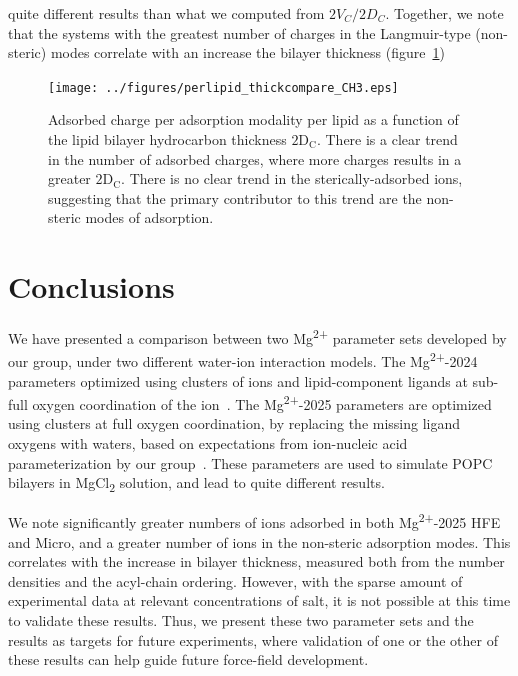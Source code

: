 \documentclass[12pt,openany,final]{book}
\newcommand{\dc}{$\text{2D}_\text{C}$}
\newcommand{\mg}{Mg\textsuperscript{2+}}
\newcommand{\mgcl}{MgCl\textsubscript{2}}
\begin{document}
quite different results than what we computed from $2V_C/2D_C$.
Together, we note that the systems with the greatest number of charges in the Langmuir-type (non-steric) modes correlate with an increase the
bilayer thickness (figure~\ref{fig:chargeperlipid})
\begin{figure}[h!]
    \caption[Adsorbed charge per mode per lipid]{Adsorbed charge per adsorption modality per lipid as a function of the lipid bilayer hydrocarbon thickness \dc{}. There is a clear trend in the number of adsorbed
        charges, where more charges results in a greater \dc{}. There is no clear trend in the sterically-adsorbed ions, suggesting that the primary contributor to this trend are
the non-steric modes of adsorption.}
    \label{fig:chargeperlipid}
    \texttt{[image: ../figures/perlipid\_thickcompare\_CH3.eps]}
\end{figure}
\section{Conclusions}
We have presented a comparison between two \mg{} parameter sets developed by our group, under two different water-ion interaction models. The \mg{-2024} parameters
optimized using clusters of ions and lipid-component ligands at sub-full oxygen coordination of the ion~\cite{saunders:2024}. The \mg{-2025} parameters are
optimized using clusters at full oxygen coordination, by replacing the missing ligand oxygens with waters, based on expectations from ion-nucleic acid parameterization
by our group~\cite{julian:2023:mg}. These parameters are used to simulate POPC bilayers in \mgcl{} solution, and lead to quite different results.

We note significantly greater numbers of ions adsorbed in both \mg{-2025} HFE and Micro, and a greater number of ions in the non-steric adsorption modes. This correlates
with the increase in bilayer thickness, measured both from the number densities and the acyl-chain ordering.
However, with the sparse amount of experimental data at relevant concentrations of salt, it is not possible at this time to validate these results. Thus, we present
these two parameter sets and the results as targets for future experiments, where validation of one or the other of these results can help guide future force-field
development.
\end{document}
